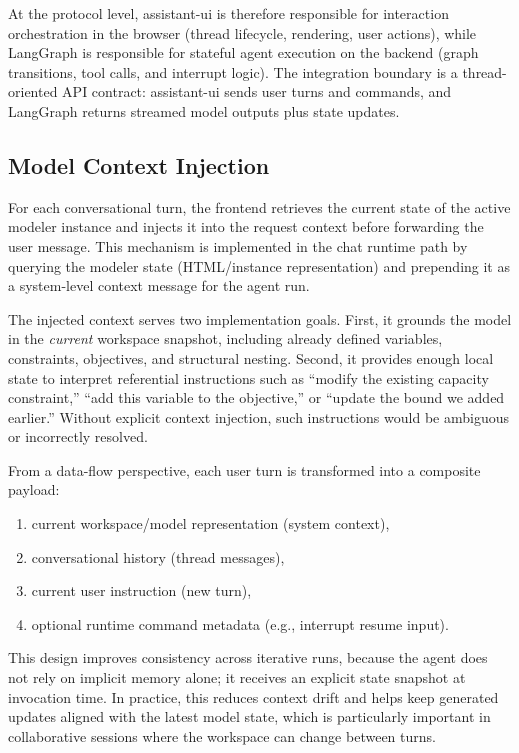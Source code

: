 At the protocol level, assistant-ui is therefore responsible for interaction orchestration in the browser (thread lifecycle, rendering, user actions), while LangGraph is responsible for stateful agent execution on the backend (graph transitions, tool calls, and interrupt logic). The integration boundary is a thread-oriented API contract: assistant-ui sends user turns and commands, and LangGraph returns streamed model outputs plus state updates.

\subsection{Model Context Injection}
For each conversational turn, the frontend retrieves the current state of the active modeler instance and injects it into the request context before forwarding the user message. This mechanism is implemented in the chat runtime path by querying the modeler state (HTML/instance representation) and prepending it as a system-level context message for the agent run.

The injected context serves two implementation goals. First, it grounds the model in the \emph{current} workspace snapshot, including already defined variables, constraints, objectives, and structural nesting. Second, it provides enough local state to interpret referential instructions such as ``modify the existing capacity constraint,'' ``add this variable to the objective,'' or ``update the bound we added earlier.'' Without explicit context injection, such instructions would be ambiguous or incorrectly resolved.

From a data-flow perspective, each user turn is transformed into a composite payload:
\begin{enumerate}
    \item current workspace/model representation (system context),
    \item conversational history (thread messages),
    \item current user instruction (new turn),
    \item optional runtime command metadata (e.g., interrupt resume input).
\end{enumerate}

This design improves consistency across iterative runs, because the agent does not rely on implicit memory alone; it receives an explicit state snapshot at invocation time. In practice, this reduces context drift and helps keep generated updates aligned with the latest model state, which is particularly important in collaborative sessions where the workspace can change between turns.

